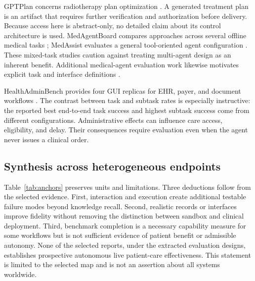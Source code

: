 GPTPlan concerns radiotherapy plan optimization \cite{gptplan2025}. A generated treatment plan is an artifact that requires further verification and authorization before delivery. Because access here is abstract-only, no detailed claim about its control architecture is used. MedAgentBoard compares approaches across several offline medical tasks \cite{medagentboard2025}; MedAssist evaluates a general tool-oriented agent configuration \cite{medassist2026}. These mixed-task studies caution against treating multi-agent design as an inherent benefit. Additional medical-agent evaluation work likewise motivates explicit task and interface definitions \cite{medicalagentsbench2026}.

HealthAdminBench provides four GUI replicas for EHR, payer, and document workflows \cite{healthadmin2026}. The contrast between task and subtask rates is especially instructive: the reported best end-to-end task success and highest subtask success come from different configurations. Administrative effects can influence care access, eligibility, and delay. Their consequences require evaluation even when the agent never issues a clinical order.

\subsection{Synthesis across heterogeneous endpoints}
Table~\ref{tab:anchors} preserves units and limitations. Three deductions follow from the selected evidence. First, interaction and execution create additional testable failure modes beyond knowledge recall. Second, realistic records or interfaces improve fidelity without removing the distinction between sandbox and clinical deployment. Third, benchmark completion is a necessary capability measure for some workflows but is not sufficient evidence of patient benefit or admissible autonomy. None of the selected reports, under the extracted evaluation designs, establishes prospective autonomous live patient-care effectiveness. This statement is limited to the selected map and is not an assertion about all systems worldwide.

